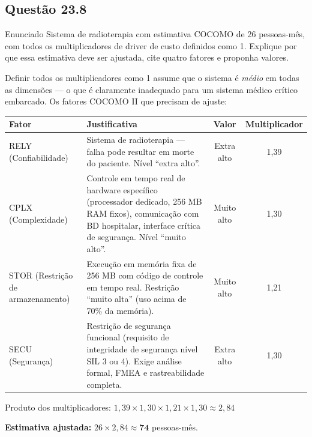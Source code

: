\documentclass[12pt,a4paper]{article}
\begin{document}
\subsection*{Questão 23.8}
\begin{questao}{Enunciado}
Sistema de radioterapia com estimativa COCOMO de 26 pessoas-mês, com todos
os multiplicadores de driver de custo definidos como 1. Explique por que
essa estimativa deve ser ajustada, cite quatro fatores e proponha valores.
\end{questao}
\begin{resposta}
Definir todos os multiplicadores como 1 assume que o sistema é \emph{médio}
em todas as dimensões — o que é claramente inadequado para um sistema médico
crítico embarcado. Os fatores COCOMO II que precisam de ajuste:

\begin{center}
\small
\begin{tabular}{p{3.5cm}p{5.5cm}cc}
\toprule
\textbf{Fator} & \textbf{Justificativa} & \textbf{Valor} & \textbf{Multiplicador} \\
\midrule
RELY (Confiabilidade) & Sistema de radioterapia — falha pode resultar em
                        morte do paciente. Nível ``extra alto''. & Extra alto & 1,39 \\
\midrule
CPLX (Complexidade) & Controle em tempo real de hardware específico
                      (processador dedicado, 256 MB RAM fixos), comunicação
                      com BD hospitalar, interface crítica de segurança.
                      Nível ``muito alto''. & Muito alto & 1,30 \\
\midrule
STOR (Restrição de armazenamento) & Execução em memória fixa de 256 MB com
                      código de controle em tempo real. Restrição ``muito
                      alta'' (uso acima de 70\% da memória). & Muito alto & 1,21 \\
\midrule
SECU (Segurança) & Restrição de segurança funcional (requisito de integridade
                   de segurança nível SIL 3 ou 4). Exige análise formal,
                   FMEA e rastreabilidade completa. & Extra alto & 1,30 \\
\bottomrule
\end{tabular}
\end{center}

Produto dos multiplicadores: $1{,}39 \times 1{,}30 \times 1{,}21 \times 1{,}30 \approx 2{,}84$

\textbf{Estimativa ajustada:} $26 \times 2{,}84 \approx \mathbf{74}$ pessoas-mês.
\end{resposta}
\end{document}
